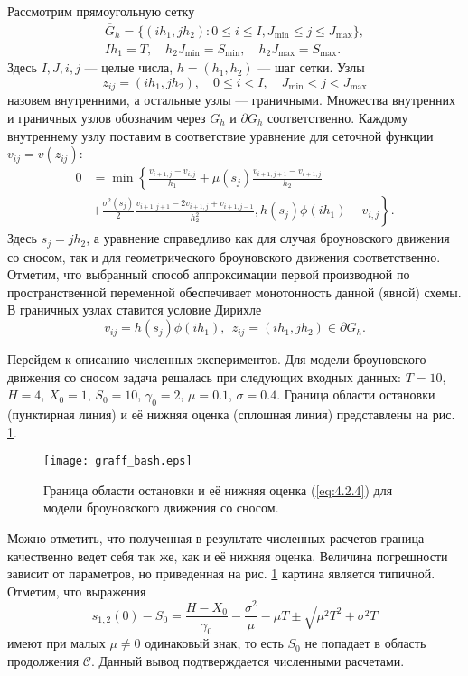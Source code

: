 Рассмотрим прямоугольную сетку
\begin{align*}
\overline G_h=\{(ih_1,jh_2): 0\le i\le I, J_{\min}\le j\le J_{\max}\},\\
Ih_1=T, \quad h_2J_{\min}=S_{\min}, \quad h_2J_{\max}=S_{\max}.
\end{align*}
Здесь $I,J,i,j$ --- целые числа, $h=(h_1,h_2)$ --- шаг сетки. Узлы $$z_{ij}=(ih_1,jh_2), \quad 0 \le i<I, \quad J_{\min}<j<J_{\max}$$
назовем внутренними, а остальные узлы --- граничными. Множества внутренних и граничных узлов обозначим через $G_h$ и $\partial G_h$ соответственно. Каждому внутреннему узлу поставим в соответствие уравнение для сеточной функции $v_{ij}=v(z_{ij})$:
\begin{align*}
0&=\min \left\{\frac{v_{i+1,j}-v_{i,j}}{h_1}+\mu(s_{j})\frac{v_{i+1,j+1}-v_{i+1,j}}{h_2}\right.\\
&+\left.\frac{\sigma^2(s_{j})}{2}\frac{v_{i+1,j+1}-2v_{i+1,j}+v_{i+1,j-1}}{h_2^2},h(s_{j}) \phi(ih_1)-v_{i,j}\right\}.
\end{align*}
Здесь $s_{j}=jh_2$, а уравнение справедливо как для случая броуновского движения со сносом, так и для геометрического броуновского движения соответственно. Отметим, что выбранный способ аппроксимации первой производной по пространственной переменной обеспечивает монотонность данной (явной) схемы. В граничных узлах ставится условие Дирихле
\begin{equation}
 \label{eq:4.3.4}
v_{ij}=h(s_{j}) \phi(ih_1),\ \ z_{ij}=(ih_1,jh_2) \in \partial G_h.
\end{equation}

Перейдем к описанию численных экспериментов. Для модели броуновского движения со сносом задача решалась при следующих входных данных: $T=10$, $H=4$, $X_0=1$, $S_0=10$, $\gamma_0=2$, $\mu=0.1$, $\sigma=0.4$. Граница области остановки (пунктирная линия) и её нижняя оценка (сплошная линия) представлены на рис. \ref{fig:4.1}.
\begin{figure}[h!]
        \centering
          \texttt{[image: graff\_bash.eps]}
         \caption{Граница области остановки и её нижняя оценка (\ref{eq:4.2.4}) для модели броуновского движения со сносом.}
          \label{fig:4.1}
\end{figure}

Можно отметить, что полученная в результате численных расчетов граница качественно ведет себя так же, как и её нижняя оценка. Величина погрешности зависит от параметров, но приведенная на рис. \ref{fig:4.1} картина является типичной. Отметим, что выражения
\begin{equation}
 \label{eq:3.5}
 s_{1,2}(0)-S_0=\frac{H-X_0}{\gamma_0}-\frac{\sigma^2}{\mu}-\mu T \pm \sqrt{\mu^2 T^2+\sigma^2 T}
\end{equation}
имеют при малых  $\mu \neq 0$ одинаковый знак, то есть $S_0$ не попадает в область продолжения $\mathcal C$. Данный вывод подтверждается численными расчетами.

